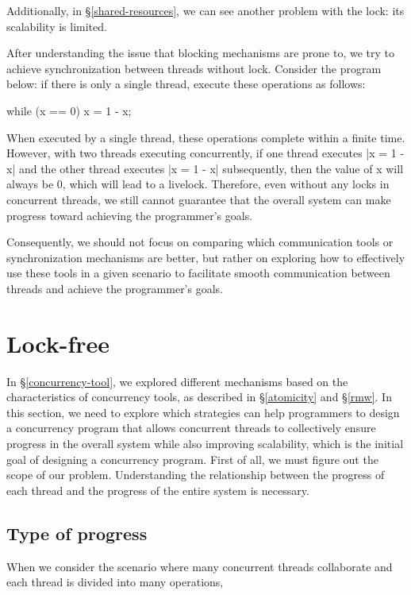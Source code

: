 \documentclass[fontsize=10pt, oneside]{scrartcl}
\newcommand{\secref}[1]{\hyperref[#1]{\textsc{\S}\ref*{#1}}}
\begin{document}
Additionally, in \secref{shared-resources}, 
we can see another problem with the lock: its scalability is limited.

After understanding the issue that blocking mechanisms are prone to, 
we try to achieve synchronization between threads without lock. 
Consider the program below: if there is only a single thread, execute these operations as follows:

\begin{cppcode}
while (x == 0)
    x = 1 - x;
\end{cppcode}

When executed by a single thread, these operations complete within a finite time. 
However, with two threads executing concurrently, 
if one thread executes \cpp|x = 1 - x| and the other thread executes \cpp|x = 1 - x| subsequently, 
then the value of x will always be 0, which will lead to a livelock. 
Therefore, even without any locks in concurrent threads, 
we still cannot guarantee that the overall system can make progress toward achieving the programmer's goals.

Consequently, we should not focus on comparing which communication tools or synchronization mechanisms are better, 
but rather on exploring how to effectively use these tools in a given scenario to facilitate smooth communication between threads and achieve the programmer's goals.

\section{Lock-free}
In \secref{concurrency-tool}, we explored different mechanisms based on the characteristics of concurrency tools, 
as described in \secref{atomicity} and \secref{rmw}.
In this section, we need to explore which strategies can help programmers to design a concurrency program 
that allows concurrent threads to collectively ensure progress in the overall system while also improving scalability, 
which is the initial goal of designing a concurrency program.
First of all, we must figure out the scope of our problem.
Understanding the relationship between the progress of each thread and the progress of the entire system is necessary.

\subsection{Type of progress}
When we consider the scenario where many concurrent threads collaborate and each thread is divided into many operations, 
\end{document}
